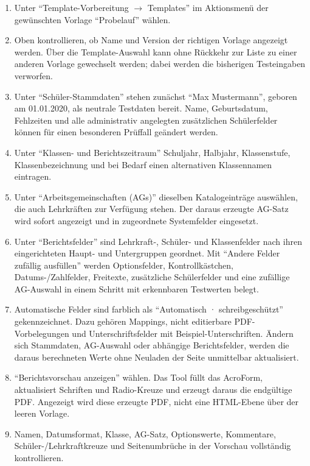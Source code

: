 \documentclass[12pt,a4paper]{article}
\begin{document}
\begin{enumerate}
  \item Unter \enquote{Template-Vorbereitung \(\rightarrow\) Templates} im Aktionsmenü der gewünschten Vorlage \enquote{Probelauf} wählen.
  \item Oben kontrollieren, ob Name und Version der richtigen Vorlage angezeigt werden. Über die Template-Auswahl kann ohne Rückkehr zur Liste zu einer anderen Vorlage gewechselt werden; dabei werden die bisherigen Testeingaben verworfen.
  \item Unter \enquote{Schüler-Stammdaten} stehen zunächst \enquote{Max Mustermann}, geboren am 01.01.2020, als neutrale Testdaten bereit. Name, Geburtsdatum, Fehlzeiten und alle administrativ angelegten zusätzlichen Schülerfelder können für einen besonderen Prüffall geändert werden.
  \item Unter \enquote{Klassen- und Berichtszeitraum} Schuljahr, Halbjahr, Klassenstufe, Klassenbezeichnung und bei Bedarf einen alternativen Klassennamen eintragen.
  \item Unter \enquote{Arbeitsgemeinschaften (AGs)} dieselben Katalogeinträge auswählen, die auch Lehrkräften zur Verfügung stehen. Der daraus erzeugte AG-Satz wird sofort angezeigt und in zugeordnete Systemfelder eingesetzt.
  \item Unter \enquote{Berichtsfelder} sind Lehrkraft-, Schüler- und Klassenfelder nach ihren eingerichteten Haupt- und Untergruppen geordnet. Mit \enquote{Andere Felder zufällig ausfüllen} werden Optionsfelder, Kontrollkästchen, Datums-/Zahlfelder, Freitexte, zusätzliche Schülerfelder und eine zufällige AG-Auswahl in einem Schritt mit erkennbaren Testwerten belegt.
  \item Automatische Felder sind farblich als \enquote{Automatisch · schreibgeschützt} gekennzeichnet. Dazu gehören Mappings, nicht editierbare PDF-Vorbelegungen und Unterschriftsfelder mit Beispiel-Unterschriften. Ändern sich Stammdaten, AG-Auswahl oder abhängige Berichtsfelder, werden die daraus berechneten Werte ohne Neuladen der Seite unmittelbar aktualisiert.
  \item \enquote{Berichtsvorschau anzeigen} wählen. Das Tool füllt das AcroForm, aktualisiert Schriften und Radio-Kreuze und erzeugt daraus die endgültige PDF. Angezeigt wird diese erzeugte PDF, nicht eine HTML-Ebene über der leeren Vorlage.
  \item Namen, Datumsformat, Klasse, AG-Satz, Optionswerte, Kommentare, Schüler-/Lehrkraftkreuze und Seitenumbrüche in der Vorschau vollständig kontrollieren.

\end{enumerate}
\end{document}
